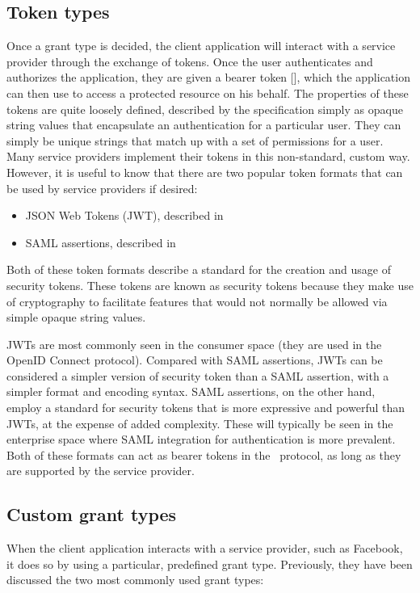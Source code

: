 \subsection{Token types}
Once a grant type is decided, the client application will interact with a service provider through the exchange of tokens. Once the user authenticates and authorizes the application, they are given a bearer token [], which the application can then use to access a protected resource on his behalf. The properties of these tokens are quite loosely defined, described by the specification simply as opaque string values that encapsulate an authentication for a particular user. They can simply be unique strings that match up with a set of permissions for a user. Many service providers implement their tokens in this non-standard, custom way. However, it is useful to know that there are two popular token formats that can be used by service providers if desired:

\begin{itemize}
    \item JSON Web Tokens (JWT), described in  \cite{RFC7519}
    \item SAML assertions, described in 
\end{itemize}

Both of these token formats describe a standard for the creation and usage of security tokens. These tokens are known as security tokens because they make use of cryptography to facilitate features that would not normally be allowed via simple opaque string values.

JWTs are most commonly seen in the consumer space (they are used in the OpenID Connect protocol). Compared with SAML assertions, JWTs can be considered a simpler version of security token than a SAML assertion, with a simpler format and encoding syntax. SAML assertions, on the other hand, employ a standard for security tokens that is more expressive and powerful than JWTs, at the expense of added complexity. These will typically be seen in the enterprise space where SAML integration for authentication is more prevalent. Both of these formats can act as bearer tokens in the \oauth\ protocol, as long as they are supported by the service provider.

\subsection{Custom grant types}
When the client application interacts with a service provider, such as Facebook, it does so by using a particular, predefined grant type. Previously, they have been discussed the two most commonly used grant types:

